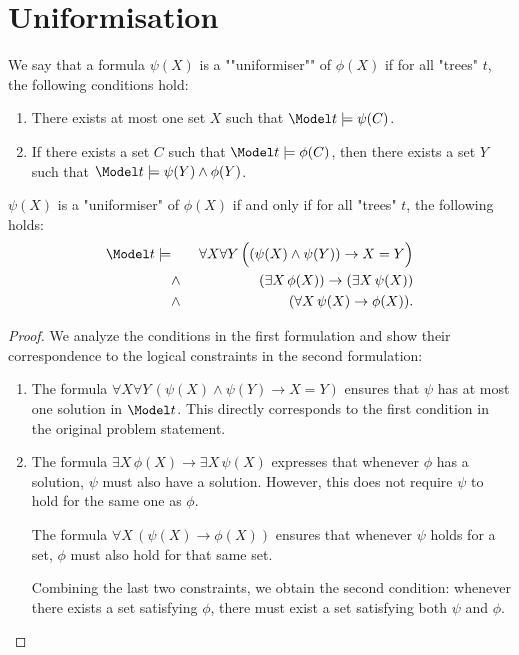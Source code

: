 \documentclass{article}
\begin{document}
\section{Uniformisation}



\begin{definition}[Uniformiser]
	We say that a formula $\psi(X)$ is a ""uniformiser"" of $\phi(X)$ if for all "trees" $t$, the following conditions hold:
	\begin{enumerate}
		\item There exists at most one set $X$ such that $\Model t \models \psi(C)$.
		\item If there exists a set $C$ such that $\Model t \models \phi(C)$, then there exists a set $Y$ such that $\Model t \models \psi(Y) \land \phi(Y)$.
	\end{enumerate}
\end{definition}

\begin{lemma}
	$\psi(X)$ is a "uniformiser" of $\phi(X)$ if and only if for all "trees" $t$, the following holds:
	\begin{eqnarray*}
		\Model t \models &\quad &  \forall X \forall Y \, \Big((\psi(X) \land \psi(Y)) \rightarrow X = Y\Big) \\
		& \land & (\exists X \, \phi(X)) \rightarrow (\exists X \, \psi(X)) \\
		& \land& (\forall X \, \psi(X) \rightarrow \phi(X)).
	\end{eqnarray*}
\end{lemma}

\begin{proof}
	We analyze the conditions in the first formulation and show their correspondence to the logical constraints in the second formulation:

	\begin{enumerate}
		\item The formula $\forall X \forall Y \, (\psi(X) \land \psi(Y) \rightarrow X = Y)$ ensures that $\psi$ has at most one solution
		      in $\Model t$. This directly corresponds to the first condition in the original problem statement.

		\item The formula $\exists X \, \phi(X) \rightarrow \exists X \, \psi(X)$ expresses that whenever $\phi$ has a solution, $\psi$ must also have a solution.
		      However, this does not require $\psi$ to hold for the same one as $\phi$.

		      The formula $\forall X \, (\psi(X) \rightarrow \phi(X))$ ensures that whenever $\psi$ holds for a set, $\phi$ must also hold for that same set.

		      Combining the last two constraints, we obtain the second condition: whenever there exists a set satisfying $\phi$, there must exist a set
		      satisfying both $\psi$ and $\phi$.
	\end{enumerate}
\end{proof}
\end{document}
